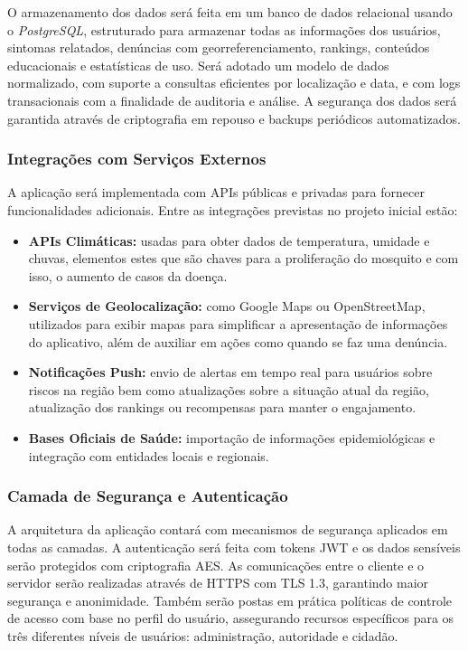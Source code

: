 \documentclass[a4paper, 12pt]{article}
\begin{document}
O armazenamento dos dados será feita em um banco de dados relacional usando o  \textit{PostgreSQL}, estruturado para armazenar todas as informações dos usuários, sintomas relatados, denúncias com georreferenciamento, rankings, conteúdos educacionais e estatísticas de uso.
Será adotado um modelo de dados normalizado, com suporte a consultas eficientes por localização e data, e com logs transacionais com a finalidade de auditoria e análise. A segurança dos dados será garantida através de criptografia em repouso e backups periódicos automatizados.

\subsubsection{Integrações com Serviços Externos}

A aplicação será implementada com APIs públicas e privadas para fornecer funcionalidades adicionais. Entre as integrações previstas no projeto inicial estão:

\begin{itemize}
    \item \textbf{APIs Climáticas:} usadas para obter dados de temperatura, umidade e chuvas, elementos estes que são chaves para a proliferação do mosquito e com isso, o aumento de casos da doença.
    \item \textbf{Serviços de Geolocalização:} como Google Maps ou OpenStreetMap, utilizados para exibir mapas para simplificar a apresentação de informações do aplicativo, além de auxiliar em ações como quando se faz uma denúncia.
    \item \textbf{Notificações Push:} envio de alertas em tempo real para usuários sobre riscos na região bem como atualizações sobre a situação atual da região, atualização dos rankings ou recompensas para manter o engajamento.
    \item \textbf{Bases Oficiais de Saúde:} importação de informações epidemiológicas e integração com entidades locais e regionais.
\end{itemize}

\subsubsection{Camada de Segurança e Autenticação}

A arquitetura da aplicação contará com mecanismos de segurança aplicados em todas as camadas. A autenticação será feita com tokens JWT e os dados sensíveis serão protegidos com criptografia AES. As comunicações entre o cliente e o servidor serão realizadas através de HTTPS com TLS 1.3, garantindo maior segurança e anonimidade. Também serão postas em prática políticas de controle de acesso com base no perfil do usuário, assegurando recursos específicos para os três diferentes níveis de usuários: administração, autoridade e cidadão.
\end{document}
